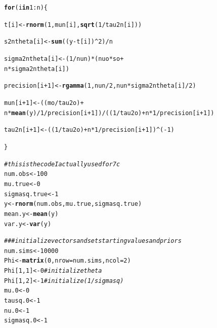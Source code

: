 \documentclass{article}\usepackage[]{graphicx}\usepackage[]{color}
\makeatletter
\newcommand{\hlnum}[1]{\textcolor[rgb]{0.686,0.059,0.569}{#1}}%
\newcommand{\hlcom}[1]{\textcolor[rgb]{0.678,0.584,0.686}{\textit{#1}}}%
\newcommand{\hlopt}[1]{\textcolor[rgb]{0,0,0}{#1}}%
\newcommand{\hlstd}[1]{\textcolor[rgb]{0.345,0.345,0.345}{#1}}%
\newcommand{\hlkwa}[1]{\textcolor[rgb]{0.161,0.373,0.58}{\textbf{#1}}}%
\newcommand{\hlkwb}[1]{\textcolor[rgb]{0.69,0.353,0.396}{#1}}%
\newcommand{\hlkwc}[1]{\textcolor[rgb]{0.333,0.667,0.333}{#1}}%
\newcommand{\hlkwd}[1]{\textcolor[rgb]{0.737,0.353,0.396}{\textbf{#1}}}%
\newenvironment{kframe}{%
 \def\at@end@of@kframe{}%
 \ifinner\ifhmode%
  \def\at@end@of@kframe{\end{minipage}}%
  \begin{minipage}{\columnwidth}%
 \fi\fi%
 \def\FrameCommand##1{\hskip\@totalleftmargin \hskip-\fboxsep
 \colorbox{shadecolor}{##1}\hskip-\fboxsep
     \hskip-\linewidth \hskip-\@totalleftmargin \hskip\columnwidth}%
 \MakeFramed {\advance\hsize-\width
   \@totalleftmargin\z@ \linewidth\hsize
   \@setminipage}}%
 {\par\unskip\endMakeFramed%
 \at@end@of@kframe}
\newenvironment{knitrout}{}{} %
\makeatother
\begin{document}
\begin{enumerate}
\begin{enumerate}
\begin{knitrout}
\begin{kframe}
\begin{alltt}
\hlkwa{for}\hlstd{(i} \hlkwa{in} \hlnum{1}\hlopt{:}\hlstd{n)\{}

  \hlstd{t[i]} \hlkwb{<-} \hlkwd{rnorm}\hlstd{(}\hlnum{1}\hlstd{,mun[i],} \hlkwd{sqrt}\hlstd{(}\hlnum{1}\hlopt{/}\hlstd{tau2n[i]))}

  \hlstd{s2ntheta[i]} \hlkwb{<-} \hlkwd{sum}\hlstd{((y}\hlopt{-}\hlstd{t[i])}\hlopt{^}\hlnum{2}\hlstd{)}\hlopt{/}\hlstd{n}

  \hlstd{sigma2ntheta[i]} \hlkwb{<-} \hlstd{(}\hlnum{1}\hlopt{/}\hlstd{nun)}\hlopt{*}\hlstd{(nuo}\hlopt{*}\hlstd{so} \hlopt{+}
                                \hlstd{n}\hlopt{*}\hlstd{sigma2ntheta[i])}

  \hlstd{precision[i}\hlopt{+}\hlnum{1}\hlstd{]} \hlkwb{<-} \hlkwd{rgamma}\hlstd{(}\hlnum{1}\hlstd{,nun}\hlopt{/}\hlnum{2}\hlstd{,nun}\hlopt{*}\hlstd{sigma2ntheta[i]}\hlopt{/}\hlnum{2}\hlstd{)}

  \hlstd{mun[i}\hlopt{+}\hlnum{1}\hlstd{]} \hlkwb{<-} \hlstd{((mo}\hlopt{/}\hlstd{tau2o)} \hlopt{+}
  \hlstd{n}\hlopt{*}\hlkwd{mean}\hlstd{(y)}\hlopt{/}\hlnum{1}\hlopt{/}\hlstd{precision[i}\hlopt{+}\hlnum{1}\hlstd{])}\hlopt{/}\hlstd{((}\hlnum{1}\hlopt{/}\hlstd{tau2o)} \hlopt{+} \hlstd{n}\hlopt{*}\hlnum{1}\hlopt{/}\hlstd{precision[i}\hlopt{+}\hlnum{1}\hlstd{])}

  \hlstd{tau2n[i}\hlopt{+}\hlnum{1}\hlstd{]} \hlkwb{<-} \hlstd{((}\hlnum{1}\hlopt{/}\hlstd{tau2o)} \hlopt{+} \hlstd{n}\hlopt{*}\hlnum{1}\hlopt{/}\hlstd{precision[i}\hlopt{+}\hlnum{1}\hlstd{])}\hlopt{^}\hlstd{(}\hlopt{-}\hlnum{1}\hlstd{)}



\hlstd{\}}
\end{alltt}
\end{kframe}
\end{knitrout}

\begin{knitrout}
\color{fgcolor}\begin{kframe}
\begin{alltt}
\hlcom{# this is the code I actually used for 7c}
\hlstd{num.obs} \hlkwb{<-} \hlnum{100}
\hlstd{mu.true} \hlkwb{<-} \hlnum{0}
\hlstd{sigmasq.true} \hlkwb{<-} \hlnum{1}
\hlstd{y} \hlkwb{<-} \hlkwd{rnorm}\hlstd{(num.obs,mu.true,sigmasq.true)}
\hlstd{mean.y} \hlkwb{<-} \hlkwd{mean}\hlstd{(y)}
\hlstd{var.y} \hlkwb{<-} \hlkwd{var}\hlstd{(y)}

\hlcom{### initialize vectors and set starting values and priors}
\hlstd{num.sims} \hlkwb{<-} \hlnum{10000}
\hlstd{Phi} \hlkwb{<-} \hlkwd{matrix}\hlstd{(}\hlnum{0}\hlstd{,}\hlkwc{nrow}\hlstd{=num.sims,}\hlkwc{ncol}\hlstd{=}\hlnum{2}\hlstd{)}
\hlstd{Phi[}\hlnum{1}\hlstd{,}\hlnum{1}\hlstd{]} \hlkwb{<-} \hlnum{0} \hlcom{# initialize theta}
\hlstd{Phi[}\hlnum{1}\hlstd{,}\hlnum{2}\hlstd{]} \hlkwb{<-} \hlnum{1} \hlcom{# initialize (1/sigmasq)}
\hlstd{mu.0} \hlkwb{<-} \hlnum{0}
\hlstd{tausq.0} \hlkwb{<-} \hlnum{1}
\hlstd{nu.0} \hlkwb{<-} \hlnum{1}
\hlstd{sigmasq.0} \hlkwb{<-} \hlnum{1}


\end{alltt}
\end{kframe}
\end{knitrout}
\end{enumerate}
\end{enumerate}
\end{document}

